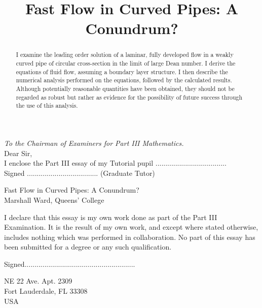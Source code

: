 \documentclass[10pt,a4paper]{report}
\begin{document}
\begin{titlepage}
\noindent
\bigskip
\textit{To the Chairman of Examiners for Part III Mathematics.}\\
Dear Sir,\\
\bigskip
I enclose the Part III essay of my Tutorial pupil ....................................\\
Signed .................................... (Graduate Tutor)
\end{titlepage}

\begin{titlepage}
\begin{center}
Fast Flow in Curved Pipes: A Conundrum? \\
\bigskip
Marshall Ward, Queens' College \\
\end{center}
\bigskip
I declare that this essay is my own work done as part of the Part III Examination. It is the result of my own work, and except where stated otherwise, includes nothing which was performed in collaboration. No part of this essay has been submitted for a degree or any such qualification. \\
\bigskip
\begin{center}
Signed........................................................ \\
\end{center}
\bigskip
\par
{} NE 22 Ave. Apt. 2309\\
Fort Lauderdale, FL 33308\\
USA

\end{titlepage}

\title{Fast Flow in Curved Pipes: A Conundrum?}
\author{}
\date{}
\maketitle

\setcounter{page}{1}

\tableofcontents
\newpage

\listoffigures
\newpage

\setcounter{page}{1}

\begin{abstract}

I examine the leading order solution of a laminar, fully developed flow in a weakly curved pipe of circular cross-section in the limit of large Dean number. I derive the equations of fluid flow, assuming a boundary layer structure. I then describe the numerical analysis performed on the equations, followed by the calculated results. Although potentially reasonable quantities have been obtained, they should not be regarded as robust but rather as evidence for the possibility of future success through the use of this analysis.

\end{abstract}
\end{document}
